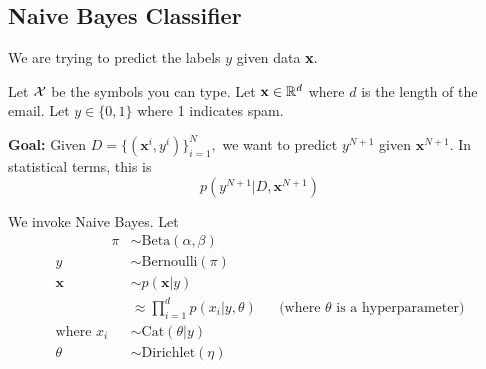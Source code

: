 \documentclass{chaistyle}
\begin{document}
\subsection*{Naive Bayes Classifier}
We are trying to predict the labels \(y\) given data \(\bf x.\)
\begin{example*}
    Let \(\cal X\) be the symbols you can type. Let \(\mathbf{x}\in\mathbb{R}^d\) where \(d\) is the length of the email. Let \(y\in\{0,1\}\) where 1 indicates spam.

    \textbf{Goal:} Given \(D=\{(\mathbf{x}^i,y^i)\}_{i=1}^N,\) we want to predict \(y^{N+1}\) given \(\mathbf{x}^{N+1}.\) In statistical terms, this is \[p(y^{N+1}|D,\textbf{x}^{N+1})\]
\end{example*}
We invoke Naive Bayes. Let \begin{align*}
    \qquad\qquad\pi&\sim\text{Beta}(\alpha,\beta) \\
    y&\sim\text{Bernoulli}(\pi) \\ 
    \mathbf{x}&\sim p(\textbf {x}|y) \\ 
    &\approx \prod_{i=1}^{d} p(x_i|y,\theta) &&\text{(where \(\theta\) is a hyperparameter)} \\
    \text{where }x_i&\sim\text{Cat}(\theta|y) \\
    \theta&\sim\text{Dirichlet}(\eta) \\
\end{align*}
\end{document}
